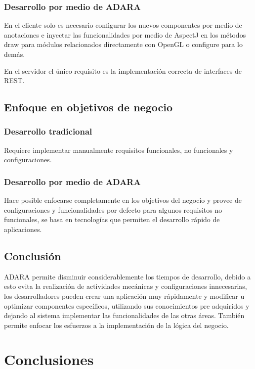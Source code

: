 \documentclass[12pt,a4paper,spanish,openany]{book}
\begin{document}
\subsection{Desarrollo por medio de ADARA}
En el cliente solo es necesario configurar los nuevos componentes por medio de
anotaciones e inyectar las funcionalidades por medio de AspectJ en los métodos
draw para módulos relacionados directamente con OpenGL o configure para lo
demás.

En el servidor el único requisito es la implementación correcta de interfaces de
REST.



\section{Enfoque en objetivos de negocio}
\subsection{Desarrollo tradicional}
Requiere implementar manualmente requisitos funcionales, no funcionales
y configuraciones.

\subsection{Desarrollo por medio de ADARA}
Hace posible enfocarse completamente en los objetivos del negocio y provee de
configuraciones y funcionalidades por defecto para algunos requisitos no
funcionales, se basa en tecnologías que permiten el desarrollo rápido de aplicaciones.

\section{Conclusión}
ADARA permite disminuir considerablemente los tiempos de desarrollo, debido a
esto evita la realización de actividades mecánicas y configuraciones
innecesarias, los desarrolladores pueden crear una aplicación muy rápidamente y
modificar u optimizar componentes específicos, utilizando sus conocimientos pre adquiridos
y dejando al sistema implementar las funcionalidades de las otras áreas. También
permite enfocar los esfuerzos a la implementación de la lógica del negocio.





\chapter{Conclusiones}
\end{document}
